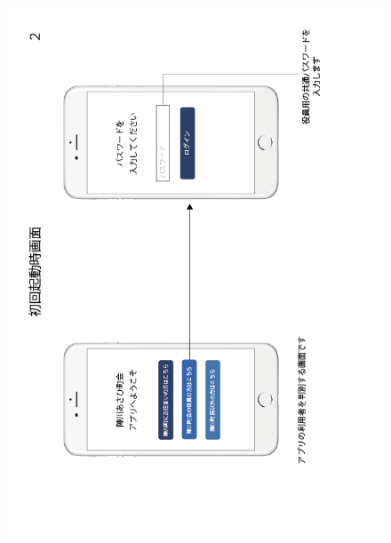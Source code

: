 \begin{figure}[h]
    \begin{center}
    \includegraphics[keepaspectratio, scale=0.7]{appendixs/appendixB_figres/fig2.png}
    \end{center}
\end{figure}


